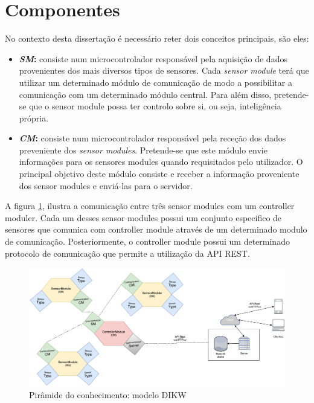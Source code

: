 \section{Componentes}

No contexto desta dissertação é necessário reter dois conceitos principais, são eles: 

\begin{itemize}
	\item \textbf{\textit{\ac{SM}}:} consiste num microcontrolador responsável pela aquisição de dados provenientes dos mais diversos tipos de sensores. Cada \textit{sensor module} terá que utilizar um determinado módulo de comunicação de modo a possibilitar a comunicação com um determinado módulo central. Para além disso, pretende-se que o sensor module possa ter controlo sobre si, ou seja, inteligência própria.   
	 
	\item \textbf{\textit{\ac{CM}}:} consiste num microcontrolador responsável pela receção dos dados preveniente dos \textit{sensor modules}. Pretende-se que este módulo envie informações para os sensores modules quando requisitados pelo utilizador. O principal objetivo deste módulo consiste e receber a informação proveniente dos sensor modules e enviá-las para o servidor. 
	
	
\end{itemize}


A figura \ref{esquema1}, ilustra a comunicação entre três sensor modules com um controller moduler. Cada um desses sensor modules possui um conjunto especifico de sensores que comunica com controller module através de um determinado modulo de comunicação. Posteriormente, o controller module possui um determinado protocolo de comunicação que permite a utilização da API REST. 


\begin{figure}[h]
	\centering
	\includegraphics[scale=0.35]{esquemas/general-electronic-modules.pdf}
	\caption{Pirâmide do conhecimento: modelo DIKW}
	\label{esquema1}
\end{figure}



